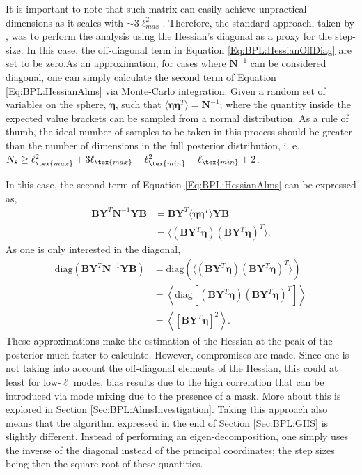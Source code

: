 \qquad It is important to note that such matrix can easily achieve unpractical dimensions as it scales with $\sim 3\ell_{max}^2$. Therefore, the standard approach, taken by \cite{SreeThesis}, was to perform the analysis using the Hessian's diagonal as a proxy for the step-size. In this case, the off-diagonal term in Equation \ref{Eq:BPL:HessianOffDiag} are set to be zero.As an approximation, for cases where $\mathbf{N}^{-1}$ can be considered diagonal, one can simply calculate the second term of Equation \ref{Eq:BPL:HessianAlms} via Monte-Carlo integration. Given a random set of variables on the sphere, $\bm{\eta}$, such that $\langle \bm{\eta} \bm{\eta}^T \rangle = \mathbf{N}^{-1}$; where the quantity inside the expected value brackets can be sampled from a normal distribution. As a rule of thumb, the ideal number of samples to be taken in this process should be greater than the number of dimensions in the full posterior distribution, i. e. $N_s \geq \ell_{\tex{max}}^2 + 3\ell_{\tex{max}} - \ell_{\tex{min}}^2 - \ell_{\tex{min}} + 2$. 

\qquad In this case, the second term of Equation \ref{Eq:BPL:HessianAlms} can be expressed as,
\begin{align}
    \mathbf{B}\mathbf{Y}^T\mathbf{N}^{-1}\mathbf{Y}\mathbf{B} & = \mathbf{B}\mathbf{Y}^T\langle \bm{\eta} \bm{\eta}^T \rangle\mathbf{Y}\mathbf{B} \\
    & = \langle (\mathbf{B}\mathbf{Y}^T\bm{\eta}) (\mathbf{B}\mathbf{Y}^T\bm{\eta})^T \rangle.
\end{align}
As one is only interested in the diagonal,
\begin{align}
    \text{diag}\left(\mathbf{B}\mathbf{Y}^T\mathbf{N}^{-1}\mathbf{Y}\mathbf{B}\right) & = \text{diag}\left(\langle (\mathbf{B}\mathbf{Y}^T\bm{\eta}) (\mathbf{B}\mathbf{Y}^T\bm{\eta})^T \rangle\right) \\
    & = \left\langle \text{diag} \left[ (\mathbf{B}\mathbf{Y}^T\bm{\eta}) (\mathbf{B}\mathbf{Y}^T\bm{\eta})^T \right] \right\rangle \\
    & = \left\langle \left[\mathbf{B}\mathbf{Y}^T\bm{\eta} \right]^2 \right\rangle.
\end{align}
These approximations make the estimation of the Hessian at the peak of the posterior much faster to calculate. However, compromises are made. Since one is not taking into account the off-diagonal elements of the Hessian, this could at least for low-$\ell$ modes, bias results due to the high correlation that can be introduced via mode mixing due to the presence of a mask. More about this is explored in Section \ref{Sec:BPL:AlmsInvestigation}. Taking this approach also means that the algorithm expressed in the end of Section \ref{Sec:BPL:GHS} is slightly different. Instead of performing an eigen-decomposition, one simply uses the inverse of the diagonal instead of the principal coordinates; the step sizes being then the square-root of these quantities.

